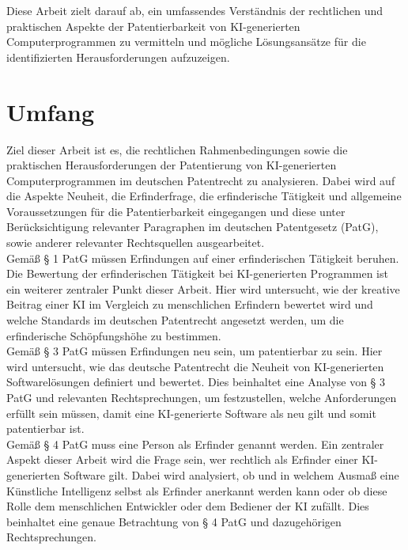Diese Arbeit zielt darauf ab, 
ein umfassendes Verständnis der rechtlichen 
und praktischen Aspekte der Patentierbarkeit von KI-generierten Computerprogrammen zu vermitteln 
und mögliche Lösungsansätze für die identifizierten Herausforderungen aufzuzeigen. 


\section{Umfang\label{sec:scope}}


Ziel dieser Arbeit ist es, 
die rechtlichen Rahmenbedingungen sowie die praktischen Herausforderungen der Patentierung 
von KI-generierten Computerprogrammen im deutschen Patentrecht zu analysieren. 
Dabei wird auf die Aspekte Neuheit, die Erfinderfrage, 
die erfinderische Tätigkeit und allgemeine Voraussetzungen für die Patentierbarkeit eingegangen 
und diese unter Berücksichtigung relevanter Paragraphen im deutschen Patentgesetz (PatG), 
sowie anderer relevanter Rechtsquellen ausgearbeitet. 
\\

Gemäß § 1 PatG müssen Erfindungen auf einer erfinderischen Tätigkeit beruhen. 
Die Bewertung der erfinderischen Tätigkeit bei KI-generierten Programmen ist ein weiterer 
zentraler Punkt dieser Arbeit. Hier wird untersucht, 
wie der kreative Beitrag einer KI im Vergleich zu menschlichen Erfindern bewertet wird und 
welche Standards im deutschen Patentrecht angesetzt werden, um die erfinderische Schöpfungshöhe zu bestimmen.
\\

Gemäß § 3 PatG müssen Erfindungen neu sein, um patentierbar zu sein. 
Hier wird untersucht, 
wie das deutsche Patentrecht die Neuheit von KI-generierten Softwarelösungen definiert und bewertet. 
Dies beinhaltet eine Analyse von § 3 PatG und relevanten Rechtsprechungen, um festzustellen, 
welche Anforderungen erfüllt sein müssen, 
damit eine KI-generierte Software als neu gilt und somit patentierbar ist. 
\\

Gemäß § 4 PatG muss eine Person als Erfinder genannt werden. 
Ein zentraler Aspekt dieser Arbeit wird die Frage sein, 
wer rechtlich als Erfinder einer KI-generierten Software gilt. 
Dabei wird analysiert, 
ob und in welchem Ausmaß eine Künstliche Intelligenz selbst als Erfinder anerkannt werden kann
oder ob diese Rolle dem menschlichen Entwickler oder dem Bediener der KI zufällt. 
Dies beinhaltet eine genaue Betrachtung von § 4 PatG und dazugehörigen Rechtsprechungen.
\\

